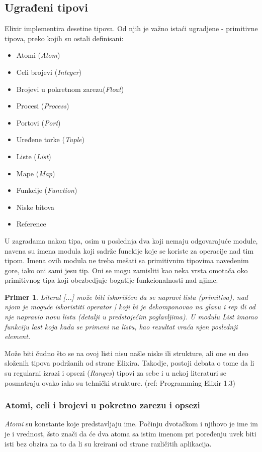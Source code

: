 \documentclass[a4paper]{article}
\newtheorem{primer}{Primer}[section]
\begin{document}
\subsection{Ugrađeni tipovi}
\label{sec:tipovi}
Elixir implementira desetine tipova. Od njih je važno istaći ugradjene - primitivne tipova, preko kojih su ostali definisani:
\begin{itemize}
  \item Atomi (\textit{Atom})
  \item Celi brojevi (\textit{Integer})
  \item Brojevi u pokretnom zarezu(\textit{Float})
  \item Procesi (\textit{Process})
  \item Portovi (\textit{Port})
  \item Uređene torke (\textit{Tuple})
  \item Liste (\textit{List})
  \item Mape (\textit{Map})
  \item Funkcije (\textit{Function})
  \item Niske bitova 
  \item Reference
\end{itemize}

U zagradama nakon tipa, osim u poslednja dva koji nemaju odgovarajuće module, navena su imena modula koji sadrže funckije koje se koriste za operacije nad tim tipom. Imena ovih modula ne treba mešati sa primitivnim tipovima navedenim gore, iako oni sami jesu tip. Oni se mogu zamisliti kao neka vrsta omotača oko primitivnog tipa koji obezbedjuje bogatije funkcionalnosti nad njime. 
\begin{primer}
Literal [...] može biti iskorišćen da se napravi lista (primitiva), nad njom je moguće iskoristiti operator | koji bi je dekomponovao na glavu i rep ili od nje napravio novu listu (detalji u predstojećim poglavljima). U modulu \textit{List} imamo funkciju \textit{last} koja kada se primeni na listu, kao rezultat vraća njen poslednji element.
\end{primer}

Može biti čudno što se na ovoj listi nisu našle niske ili strukture, ali one su deo složenih tipova podržanih od strane Elixira. Takodje, postoji debata o tome da li su regularni izrazi i opsezi (\textit{Ranges}) tipovi za sebe i u nekoj literaturi se posmatraju ovako iako su tehnički strukture. (ref: Programming Elixir 1.3)

\subsubsection{Atomi, celi i brojevi u pokretno zarezu i opsezi}
\label{sec:ime}
\textit{Atomi} su konstante koje predstavljaju ime. Počinju dvotačkom i njihovo je ime im je i vrednost, šsto znači da će dva atoma sa istim imenom pri poređenju uvek biti isti bez obzira na to da li su kreirani od strane različitih aplikacija.
\end{document}
